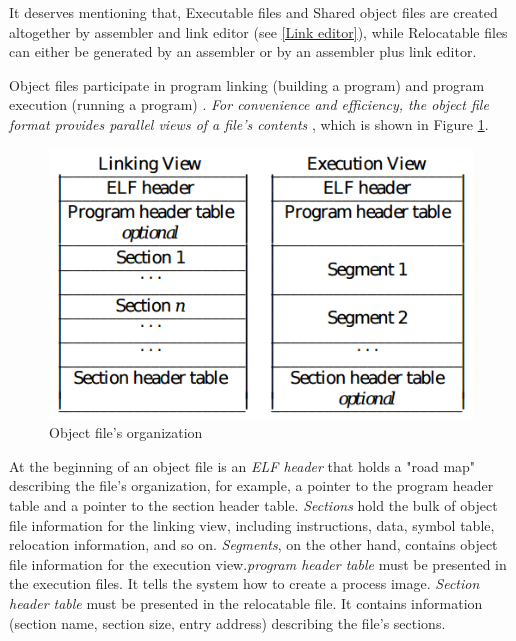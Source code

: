           It deserves mentioning that, Executable files and Shared object files are created altogether by assembler and link editor (see \ref{Link editor}), while Relocatable files can either be generated by an assembler or by an assembler plus link editor\cite{TIS-95}.  
       
        Object files participate in program linking (building a program) and program execution (running a program) \cite{SCO-97}. \textit{For convenience and efficiency, the object file format provides parallel views of a file's contents} \cite{SCO-97}, which is shown in Figure \ref{fig:ELFoverview}. 
        
            \begin{figure}[H]
                \centering
                \includegraphics[scale = 0.4]
                {Images/concepts/ELFoverview.png}
                \caption[Object file's organization]%
                {Object file's organization\cite{SCO-97}}    
                \label{fig:ELFoverview}
            \end{figure}
           
        
            At the beginning of an object file is an \textit{ELF header} that holds a "road map" describing the file's organization, for example, a pointer to the program header table and a pointer to the section header table. \textit{Sections} hold the bulk of object file information for the linking view, including instructions, data, symbol table, relocation information, and so on\cite{SCO-97}. \textit{Segments}, on the other hand, contains object file information for the execution view.\textit{program header table} must be presented in the execution files. It tells the system how to create a process image\cite{SCO-97}. \textit{Section header table} must be presented in the relocatable file. It contains information (section name, section size, entry address) describing the file's sections. 
            

